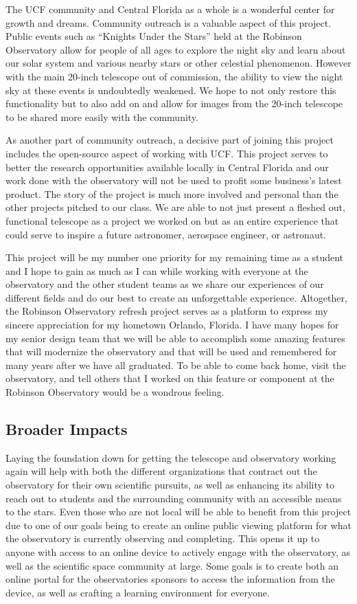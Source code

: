 \documentclass[12pt]{article}
\begin{document}
The UCF community and Central Florida as a whole is a wonderful center for growth and dreams.  Community outreach is a valuable aspect of this project.  Public events such as “Knights Under the Stars” held at the Robinson Observatory allow for people of all ages to explore the night sky and learn about our solar system and various nearby stars or other celestial phenomenon.  However with the main 20-inch telescope out of commission, the ability to view the night sky at these events is undoubtedly weakened.  We hope to not only restore this functionality but to also add on and allow for images from the 20-inch telescope to be shared more easily with the community.

As another part of community outreach, a decisive part of joining this project includes the open-source aspect of working with UCF.  This project serves to better the research opportunities available locally in Central Florida and our work done with the observatory will not be used to profit some business’s latest product.  The story of the project is much more involved and personal than the other projects pitched to our class.  We are able to not just present a fleshed out, functional telescope as a project we worked on but as an entire experience that could serve to inspire a future astronomer, aerospace engineer, or astronaut.

This project will be my number one priority for my remaining time as a student and I hope to gain as much as I can while working with everyone at the observatory and the other student teams as we share our experiences of our different fields and do our best to create an unforgettable experience.  Altogether, the Robinson Observatory refresh project serves as a platform to express my sincere appreciation for my hometown Orlando, Florida. I have many hopes for my senior design team that we will be able to accomplish some amazing features that will modernize the observatory and that will be used and remembered for many years after we have all graduated.  To be able to come back home, visit the observatory, and tell others that I worked on this feature or component at the Robinson Observatory would be a wondrous feeling.

\subsection{Broader Impacts}

Laying the foundation down for getting the telescope and observatory working again will help with both the different organizations that contract out the observatory for their own scientific pursuits, as well as enhancing its ability to reach out to students and the surrounding community with an accessible means to the stars. Even those who are not local will be able to benefit from this project due to one of our goals being to create an online public viewing platform for what the observatory is currently observing and completing. This opens it up to anyone with access to an online device to actively engage with the observatory, as well as the scientific space community at large. Some goals is to create both an online portal for the observatories sponsors to access the information from the device, as well as crafting a learning environment for everyone.
\end{document}

